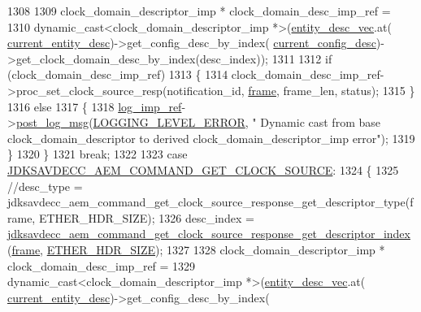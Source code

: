 \begin{DoxyCode}
{{{1308 
1309         clock\_domain\_descriptor\_imp * clock\_domain\_desc\_imp\_ref =
1310             \textcolor{keyword}{dynamic\_cast<}clock\_domain\_descriptor\_imp *\textcolor{keyword}{>}(\hyperlink{classavdecc__lib_1_1end__station__imp_a72edab41bc56e3c1757944a7df188a3d}{entity\_desc\_vec}.at(
      \hyperlink{classavdecc__lib_1_1end__station__imp_afd78c89df26ba7641e1adb764c0e827d}{current\_entity\_desc})->get\_config\_desc\_by\_index(
      \hyperlink{classavdecc__lib_1_1end__station__imp_a60b1af40d35e8a86b0082c54ab6cb6a8}{current\_config\_desc})->get\_clock\_domain\_desc\_by\_index(desc\_index));
1311 
1312         \textcolor{keywordflow}{if} (clock\_domain\_desc\_imp\_ref)
1313         \{
1314             clock\_domain\_desc\_imp\_ref->proc\_set\_clock\_source\_resp(notification\_id, 
      \hyperlink{gst__avb__playbin_8c_ac8e710e0b5e994c0545d75d69868c6f0}{frame}, frame\_len, status);
1315         \}
1316         \textcolor{keywordflow}{else}
1317         \{
1318             \hyperlink{namespaceavdecc__lib_acbe3e2a96ae6524943ca532c87a28529}{log\_imp\_ref}->\hyperlink{classavdecc__lib_1_1log_a68139a6297697e4ccebf36ccfd02e44a}{post\_log\_msg}(\hyperlink{namespaceavdecc__lib_a501055c431e6872ef46f252ad13f85cdaf2c4481208273451a6f5c7bb9770ec8a}{LOGGING\_LEVEL\_ERROR}, \textcolor{stringliteral}{"
      Dynamic cast from base clock\_domain\_descriptor to derived clock\_domain\_descriptor\_imp error"});
1319         \}
1320     \}
1321     \textcolor{keywordflow}{break};
1322 
1323     \textcolor{keywordflow}{case} \hyperlink{group__command_ga4d005d95910af9d509b33a7beba634d2}{JDKSAVDECC\_AEM\_COMMAND\_GET\_CLOCK\_SOURCE}:
1324     \{
1325         \textcolor{comment}{//desc\_type = jdksavdecc\_aem\_command\_get\_clock\_source\_response\_get\_descriptor\_type(frame,
       ETHER\_HDR\_SIZE);}
1326         desc\_index = 
      \hyperlink{group__command__get__clock__source__response_gad8b3114a21e48deca8292d646417d4ce}{jdksavdecc\_aem\_command\_get\_clock\_source\_response\_get\_descriptor\_index}
      (\hyperlink{gst__avb__playbin_8c_ac8e710e0b5e994c0545d75d69868c6f0}{frame}, \hyperlink{namespaceavdecc__lib_a6c827b1a0d973e18119c5e3da518e65ca9512ad9b34302ba7048d88197e0a2dc0}{ETHER\_HDR\_SIZE});
1327 
1328         clock\_domain\_descriptor\_imp * clock\_domain\_desc\_imp\_ref =
1329             \textcolor{keyword}{dynamic\_cast<}clock\_domain\_descriptor\_imp *\textcolor{keyword}{>}(\hyperlink{classavdecc__lib_1_1end__station__imp_a72edab41bc56e3c1757944a7df188a3d}{entity\_desc\_vec}.at(
      \hyperlink{classavdecc__lib_1_1end__station__imp_afd78c89df26ba7641e1adb764c0e827d}{current\_entity\_desc})->get\_config\_desc\_by\_index(
}}}
\end{DoxyCode}
